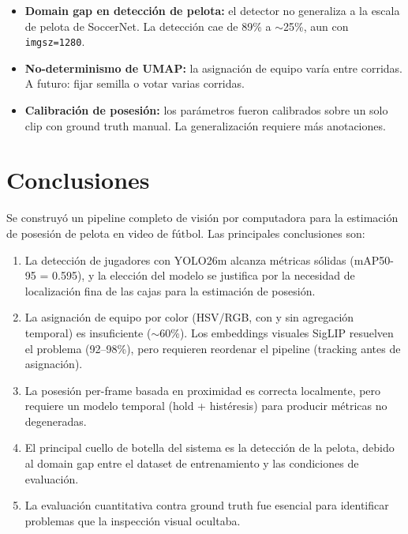 \documentclass[conference]{IEEEtran}
\begin{document}
\begin{itemize}
    \item \textbf{Domain gap en detección de pelota:} el detector no
    generaliza a la escala de pelota de SoccerNet. La detección cae de 89\%
    a $\sim$25\%, aun con \texttt{imgsz=1280}.
    \item \textbf{No-determinismo de UMAP:} la asignación de equipo varía
    entre corridas. A futuro: fijar semilla o votar varias corridas.
    \item \textbf{Calibración de posesión:} los parámetros fueron
    calibrados sobre un solo clip con ground truth manual. La
    generalización requiere más anotaciones.
\end{itemize}

\section{Conclusiones}
\label{sec:conclusiones}

Se construyó un pipeline completo de visión por computadora para la
estimación de posesión de pelota en video de fútbol. Las principales
conclusiones son:

\begin{enumerate}
    \item La detección de jugadores con YOLO26m alcanza métricas sólidas
    (mAP50-95 = 0.595), y la elección del modelo se justifica por la
    necesidad de localización fina de las cajas para la estimación de
    posesión.
    \item La asignación de equipo por color (HSV/RGB, con y sin agregación
    temporal) es insuficiente ($\sim$60\%). Los embeddings visuales SigLIP
    resuelven el problema (92--98\%), pero requieren reordenar el pipeline
    (tracking antes de asignación).
    \item La posesión per-frame basada en proximidad es correcta
    localmente, pero requiere un modelo temporal (hold + histéresis) para
    producir métricas no degeneradas.
    \item El principal cuello de botella del sistema es la detección de la
    pelota, debido al domain gap entre el dataset de entrenamiento y las
    condiciones de evaluación.
    \item La evaluación cuantitativa contra ground truth fue esencial para
    identificar problemas que la inspección visual ocultaba.
\end{enumerate}
\end{document}
